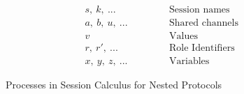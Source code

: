 \documentclass[12pt,twoside]{report}
\newcommand{\white}{\ \ \ \ \ \ \ \ \ \ \ \ }
\begin{document}
\begin{figure}[h]
\begin{equation*}
\begin{array}{rrlcr}
        &&s,\ k,\ ... & \white & \text{Session\ names}\\[2.75pt]
        &&a,\ b,\ u,\ ... & \white & \text{Shared\ channels}\\[2.75pt]
        &&v & \white & \text{Values}\\
        &&r,\ r',\ ... & \white & \text{Role\ Identifiers}\\[2.75pt]
        &&x,\ y,\ z,\ ... & \white & \text{Variables}
        \end{array}
    \end{equation*}
    \caption{Processes in Session Calculus for Nested Protocols}
    \label{nested_session_calculus}
\end{figure}{}
\end{document}

